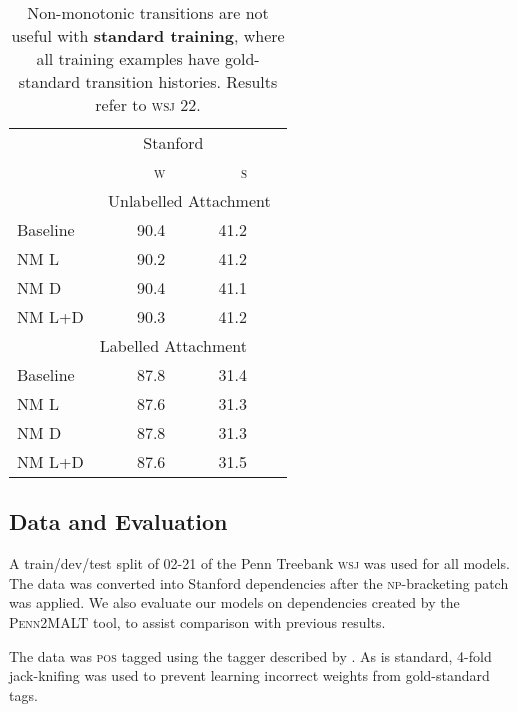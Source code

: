 \documentclass[11pt,letterpaper]{article}
\newcommand{\pos}{\textsc{pos}\xspace}
\newcommand{\wsj}{\textsc{wsj}\xspace}
\begin{document}
\begin{table}[t]

    \small
    \centering
    \begin{tabular}{l|rrrr}
        \hline
        & \multicolumn{2}{c}{Stanford} \\
        & \textsc{w}  & \textsc{s} \\
\hline \hline
        & \multicolumn{4}{c}{Unlabelled Attachment} \\
        \hline
Baseline & 90.4 & 41.2 \\
NM L & 90.2 & 41.2 \\
NM D & 90.4 & 41.1 \\
NM L+D & 90.3 & 41.2\\
\hline
            & \multicolumn{2}{c}{Labelled Attachment} \\
            \hline
Baseline & 87.8 & 31.4 \\
NM L & 87.6 & 31.3 \\
NM D & 87.8 & 31.3 \\
NM L+D & 87.6 & 31.5 \\
\hline
    \end{tabular}
    \caption{\small Non-monotonic transitions are not useful with
        \textbf{standard training},
where all training examples have gold-standard transition histories. Results refer to
\wsj 22.\label{tab:standard}}
\end{table}


\subsection{Data and Evaluation}

A train/dev/test split of 02-21 of the Penn Treebank \textsc{wsj} \citep{marcus:94}
was used for all models. The data was converted into
Stanford dependencies \citep{stanford_deps} after the \citet{vadas:07}
\textsc{np}-bracketing patch was applied. We also evaluate our models on
dependencies created by the \textsc{Penn2MALT} tool, to assist comparison 
with previous results.

The data was \pos tagged using the tagger described by \citep{zhang_pos:11}.
As is standard, 4-fold jack-knifing was used to prevent learning incorrect
weights from gold-standard tags.
\end{document}
